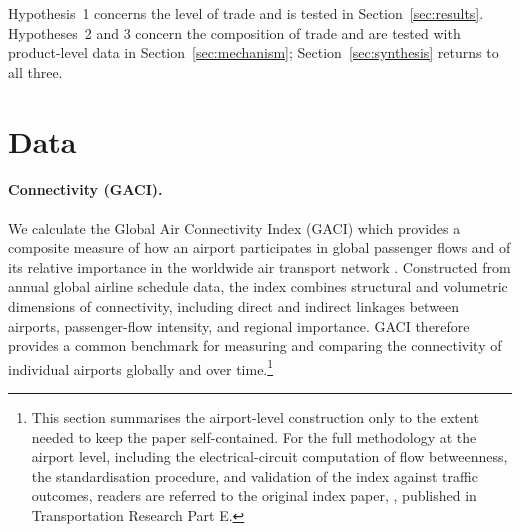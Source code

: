 Hypothesis~1 concerns the level of trade and is tested in
Section~\ref{sec:results}. Hypotheses~2 and 3 concern the composition of
trade and are tested with product-level data in
Section~\ref{sec:mechanism}; Section~\ref{sec:synthesis} returns to all
three.

\section{Data}
\label{sec:data}

\paragraph{Connectivity (GACI).}
We calculate the Global Air Connectivity Index (GACI) which provides a composite measure of how an airport participates in global passenger flows and of its relative importance in the worldwide air transport network \citep{Cheung_2020}. Constructed from annual global airline schedule data, the index combines structural and volumetric dimensions of connectivity, including direct and indirect linkages between airports, passenger-flow intensity, and regional importance. GACI therefore provides a common benchmark for measuring and comparing the connectivity of individual airports globally and over time.\footnote{This section summarises the airport-level construction only to the extent needed to keep the paper self-contained. For the full methodology at the airport level, including the electrical-circuit computation of flow betweenness, the standardisation procedure, and validation of the index against traffic outcomes, readers are referred to the original index paper, \citet{Cheung_2020}, published in Transportation Research Part E.}

